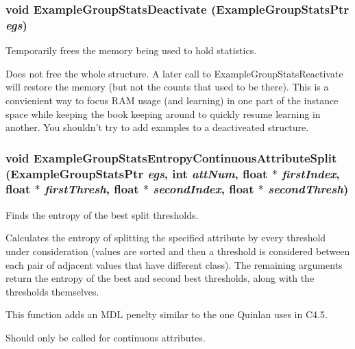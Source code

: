 \subsubsection{\setlength{\rightskip}{0pt plus 5cm}void Example\-Group\-Stats\-Deactivate ({\bf Example\-Group\-Stats\-Ptr} {\em egs})}\label{ExampleGroupStats_8h_a22}


Temporarily frees the memory being used to hold statistics. 

Does not free the whole structure. A later call to Example\-Group\-Stats\-Reactivate will restore the memory (but not the counts that used to be there). This is a convienient way to focus RAM usage (and learning) in one part of the instance space while keeping the book keeping around to quickly resume learning in another. You shouldn't try to add examples to a deactiveated structure. 
\subsubsection{\setlength{\rightskip}{0pt plus 5cm}void Example\-Group\-Stats\-Entropy\-Continuous\-Attribute\-Split ({\bf Example\-Group\-Stats\-Ptr} {\em egs}, int {\em att\-Num}, float $\ast$ {\em first\-Index}, float $\ast$ {\em first\-Thresh}, float $\ast$ {\em second\-Index}, float $\ast$ {\em second\-Thresh})}\label{ExampleGroupStats_8h_a46}


Finds the entropy of the best split thresholds. 

Calculates the entropy of splitting the specified attribute by every threshold under consideration (values are sorted and then a threshold is considered between each pair of adjacent values that have different class). The remaining arguments return the entropy of the best and second best thresholds, along with the thresholds themselves.

This function adds an MDL penelty similar to the one Quinlan uses in C4.5.

Should only be called for continuous attributes. 
